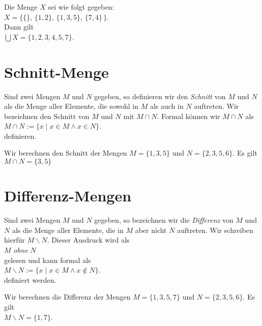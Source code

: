 \example
Die Menge $X$ sei wie folgt gegeben: \\[0.2cm]
\hspace*{1.3cm}
 $X = \big\{ \{\},\, \{1,2\}, \, \{1,3,5\}, \, \{7,4\}\,\big\}$. \\[0.2cm]
Dann gilt \\[0.2cm]
\hspace*{1.3cm}
 $\bigcup X = \{ 1, 2, 3, 4, 5, 7 \}$. \eox

\section{Schnitt-Menge}
Sind zwei Mengen $M$ und $N$ gegeben, so definieren wir den \emph{Schnitt} von
$M$ und $N$ als die Menge aller Elemente, die sowohl in $M$ als auch in $N$
auftreten.  Wir bezeichnen den Schnitt von $M$ und $N$ mit $M \cap N$.
Formal k\"{o}nnen wir $M \cap N$ als 
\\[0.2cm]
\hspace*{1.3cm} $M \cap N := \{ x \mid x \in M \wedge x \in N \}$.
\\[0.2cm]
definieren.


\example
Wir berechnen den Schnitt der  Mengen $M = \{ 1, 3, 5 \}$ und $N = \{ 2, 3, 5, 6 \}$.  Es gilt
\\[0.2cm]
\hspace*{1.3cm} $M \cap N = \{ 3, 5 \}$
\eox

\section{Differenz-Mengen}
 Sind zwei Mengen $M$ und $N$ gegeben, so bezeichnen wir die \emph{Differenz} von
 $M$ und $N$ als die Menge aller Elemente, die in $M$ aber nicht $N$
 auftreten.  Wir schreiben hierf\"{u}r $M \backslash N$.  Dieser Ausdruck wird als
\\[0.2cm]
\hspace*{1.3cm}
$M$ \emph{ohne} $N$
\\[0.2cm]
gelesen und kann formal als
 \\[0.2cm]
\hspace*{1.3cm} $M \backslash N := \{ x \mid x \in M \wedge x \not\in N \}$. 
 \\[0.2cm] 
definiert werden.


\example
Wir berechnen die Differenz der Mengen $M = \{ 1, 3, 5, 7 \}$ und $N = \{ 2, 3, 5, 6 \}$.  Es gilt
\\[0.2cm]
\hspace*{1.3cm} $M \backslash N = \{ 1, 7 \}$. \eox

